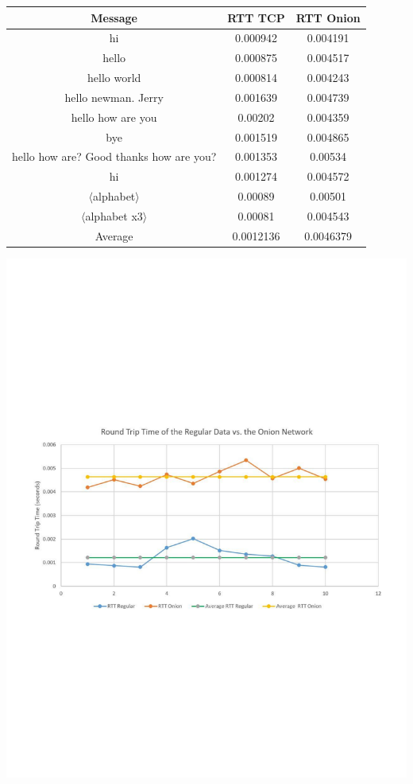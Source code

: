 \documentclass[10pt]{report}
\begin{document}
\begin{center}
    \begin{tabular}{|c|c|c|}
    \hline
    Message & RTT TCP & RTT Onion \\
    \hline
    hi & 0.000942 &    0.004191 \\
    hello &    0.000875 & 0.004517 \\
    hello world & 0.000814 & 0.004243 \\
    hello newman. Jerry & 0.001639 & 0.004739 \\
    hello how are you & 0.00202 & 0.004359 \\
    bye & 0.001519 & 0.004865 \\
    hello how are? Good thanks how are you? & 0.001353 & 0.00534 \\
    hi & 0.001274 & 0.004572 \\
    $\langle$alphabet$\rangle$ & 0.00089 & 0.00501 \\
    $\langle$alphabet x3$\rangle$ & 0.00081 & 0.004543 \\
    \hline
    Average & 0.0012136 & 0.0046379 \\
    \hline
    \end{tabular}
\end{center}
\begin{center}
    \includegraphics[width=1\textwidth]{timingGraph.pdf}~\par\vspace{1cm}
\end{center}
\end{document}
